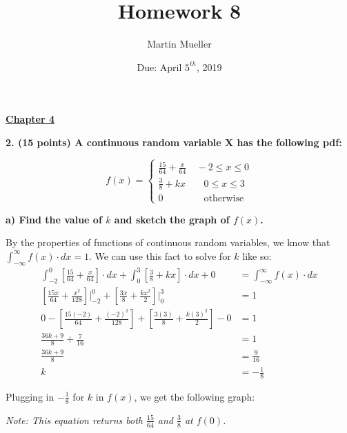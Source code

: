 \documentclass[12pt, letter]{article}
\title{Homework 8}
\author{Martin Mueller}
\date{Due: April $5^{th}$, 2019}
\begin{document}
\maketitle

\begin{center}
	\underline{\textbf{Chapter 4}}
\end{center}

\textbf{2. (15 points) A continuous random variable X has the following pdf:}
\def\arraystretch{1.2}
\begin{center}
	\[f(x) = \left\{
    		\begin{array}{cc}
        		\frac{15}{64} + \frac{x}{64} & \: -2 \le x \le 0 \\
        		\frac{3}{8} + kx & \quad 0 \le x \le 3 \\
        		0 & \quad \text{otherwise}
        	\end{array}
        \right.\]
\end{center}

\qquad \textbf{a) Find the value of $k$ and sketch the graph of $f(x)$.}
\begin{center}
	By the properties of functions of continuous random variables, we know that $\int_{-\infty}^{\infty} f(x) \cdot dx = 1$. We can use this fact to solve for $k$ like so:
	\begin{align*}
		\int_{-2}^{0} \left[\frac{15}{64} + \frac{x}{64}\right] \cdot dx + \int_{0}^{3} \left[\frac{3}{8} + kx\right] \cdot dx + 0 &= \int_{-\infty}^{\infty} f(x) \cdot dx \\
		\left[\frac{15x}{64} + \frac{x^{2}}{128}\right] \Bigg|_{-2}^{0} + \left[\frac{3x}{8} + \frac{kx^{2}}{2}\right] \Bigg|_{0}^{3} &= 1 \\
		0 - \left[\frac{15(-2)}{64} + \frac{(-2)^{2}}{128}\right] + \left[\frac{3(3)}{8} + \frac{k(3)^{2}}{2}\right] - 0 &= 1 \\
		\frac{36k + 9}{8} + \frac{7}{16} &= 1 \\
		\frac{36k + 9}{8} &= \frac{9}{16} \\
		k &= \boxed{- \frac{1}{8}}
	\end{align*}
	
	\pagebreak	
	
	Plugging in $- \frac{1}{8}$ for $k$ in $f(x)$, we get the following graph:
	
	
	\textit{Note: This equation returns both $\frac{15}{64}$ and $\frac{3}{8}$ at $f(0)$.}
\end{center}
\end{document}
